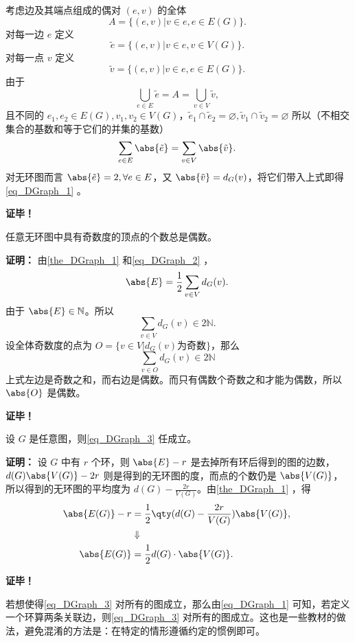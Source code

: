 考虑边及其端点组成的偶对 $(e,v)$ 的全体
\begin{equation}
A=\{(e,v)|v\in e,e\in E(G)\}.~
\end{equation}
对每一边 $e$ 定义
\begin{equation}
\tilde e=\{(e,v)|v\in e,v\in V(G)\}.~
\end{equation}
对每一点 $v$ 定义
\begin{equation}
\tilde v=\{(e,v)|v\in e,e\in E(G)\}.~
\end{equation}
由于 
\begin{equation}
\bigcup_{e\in E}\tilde e=A=\bigcup_{v\in V}\tilde v,~
\end{equation}
且不同的 $e_1,e_2\in E(G),v_1,v_2\in V(G)$，$\tilde e_1\cap\tilde e_2=\varnothing,\tilde v_1\cap\tilde v_2=\varnothing$
所以（不相交集合的基数和等于它们的并集的基数）
\begin{equation}
\sum_{e\in E}\abs{\tilde e}=\sum_{v\in V}\abs{\tilde v}.~
\end{equation}
对无环图而言 $\abs{\tilde e}=2,\forall e\in E$，又 $\abs{\tilde v}=d_G(v)$，将它们带入上式即得\autoref{eq_DGraph_1} 。

\textbf{证毕！}

\begin{corollary}{}
任意无环图中具有奇数度的顶点的个数总是偶数。
\end{corollary}
\textbf{证明：}
由\autoref{the_DGraph_1} 和\autoref{eq_DGraph_2} ，
\begin{equation}
\abs{E}=\frac{1}{2}\sum_{v\in V}d_G(v).~
\end{equation}
由于 $\abs{E}\in\mathbb N$。所以 
\begin{equation}
\sum_{v\in V}d_G(v)\in 2\mathbb N.~
\end{equation}
设全体奇数度的点为 $O=\{v\in V|d_G(v)\text{为奇数}\}$，那么
\begin{equation}
\sum_{v\in O}d_G(v)\in 2\mathbb N~
\end{equation}
上式左边是奇数之和，而右边是偶数。而只有偶数个奇数之和才能为偶数，所以 $\abs{O}$ 是偶数。

\textbf{证毕！}

\begin{corollary}{}
设 $G$ 是任意图，则\autoref{eq_DGraph_3} 任成立。
\end{corollary}

\textbf{证明：}
设 $G$ 中有 $r$ 个环，则 $\abs{E}-r$ 是去掉所有环后得到的图的边数，$d(G)\abs{V(G)}-2r$ 则是得到的无环图的度，而点的个数仍是 $\abs{V(G)}$，所以得到的无环图的平均度为 $d(G)-\frac{2r}{V(G)}$。由\autoref{the_DGraph_1} ，得
\begin{equation}
\begin{aligned}
\abs{E(G)}-r&=\frac{1}{2}\qty(d(G)-\frac{2r}{V(G)})\abs{V(G)},\\
&\Downarrow\\
\abs{E(G)}&=\frac{1}{2}d(G)\cdot\abs{V(G)}.
\end{aligned}~
\end{equation}

\textbf{证毕！}

若想使得\autoref{eq_DGraph_3} 对所有的图成立，那么由\autoref{eq_DGraph_1} 可知，若定义一个环算两条关联边，则\autoref{eq_DGraph_3} 对所有的图成立。这也是一些教材的做法，避免混淆的方法是：在特定的情形遵循约定的惯例即可。









